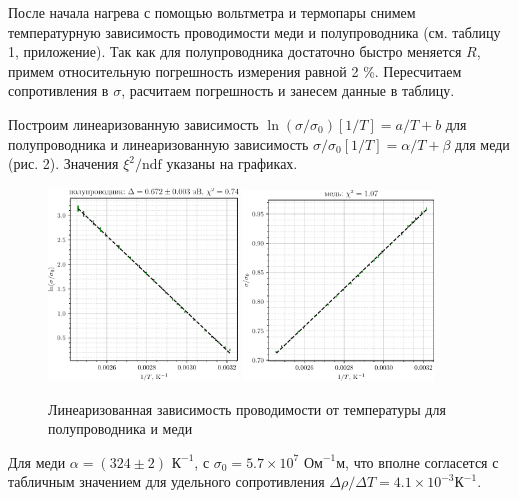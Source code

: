 После начала нагрева с помощью вольтметра и термопары снимем температурную зависимость проводимости меди и полупроводника (см. таблицу 1, приложение). Так как для полупроводника достаточно быстро меняется $R$, примем относительную погрешность измерения равной 2 \%. Пересчитаем сопротивления в $\sigma$, расчитаем погрешность и занесем данные в таблицу.


Построим линеаризованную зависимость $\ln(\sigma/\sigma_0)[1/T] = a / T + b$ для полупроводника и линеаризованную зависимость $\sigma/\sigma_0 [1/T] = \alpha /T + \beta$ для меди (рис. 2). Значения $\xi^2/\text{ndf}$ указаны на графиках. 

\begin{figure}[h]
    \centering
    \includegraphics[width=0.45\textwidth]{plot_sc_6.11.1.pdf}
    \hspace{5 mm} 
    \includegraphics[width=0.45\textwidth]{plot_cu_6.11.1.pdf}
    \caption{Линеаризованная зависимость проводимости от температуры для полупроводника и меди}
    \label{fig:sccu}
\end{figure}

Для меди $\alpha = (324 \pm 2) \text{ К}^{-1}$, с $\sigma_0 = 5.7  \times  10^7 \text{ Ом}^{-1} \text{м}$, что вполне согласется с табличным значением для удельного сопротивления  $\Delta \rho / \Delta T = 4.1 \times 10^{-3} \text{К}^{-1}$.

